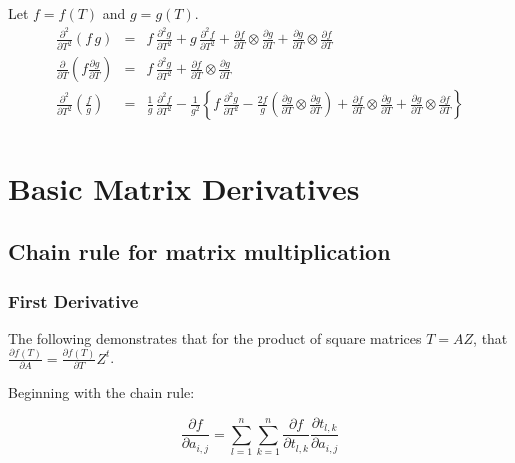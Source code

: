 \documentclass{report}
\begin{document}
\noindent Let $f=f(T)$ and $g=g(T)$.
\begin{eqnarray}
\frac{\partial^2}{\partial T^2} \left( f \, g \right) & = & f \, \frac{\partial^2 g}{\partial T^2} + g \, \frac{\partial^2 f}{\partial T^2} + \frac{\partial f}{\partial T} \otimes \frac{\partial g}{\partial T} +  \frac{\partial g}{\partial T} \otimes \frac{\partial f}{\partial T} \label{prod2} \\
\frac{\partial}{\partial T} \left( f \frac{\partial g}{\partial T} \right) & = & f \, \frac{\partial^2 g}{\partial T^2} + \frac{\partial f}{\partial T} \otimes \frac{\partial g}{\partial T} \label{diffusionopp} \\
\frac{\partial^2}{\partial T^2} \left( \frac{f}{g} \right) & = & \frac{1}{g} \, \frac{\partial^2 f}{\partial T^2} - \frac{1}{g^2} \left\{ f \, \frac{\partial^2 g}{\partial T^2} - \frac{2f}{g} \left( \frac{\partial g}{\partial T} \otimes \frac{\partial g}{\partial T} \right) + \frac{\partial f}{\partial T} \otimes \frac{\partial g}{\partial T} +  \frac{\partial g}{\partial T} \otimes \frac{\partial f}{\partial T} \right\} \nonumber \label{quotient2} \\
\end{eqnarray}

\chapter{Basic Matrix Derivatives}


\section{Chain rule for matrix multiplication}

\subsection{First Derivative}

The following demonstrates that for the product of square matrices $T = A Z$,
that $\frac{\partial f(T)}{\partial A} = \frac{\partial f(T)}{\partial T} Z^t$. \newline

\noindent Beginning with the chain rule:

\begin{equation} 
\label{eqn0}
\frac{\partial f}{\partial a_{i,j}} = 
\sum_{l=1}^{n} \sum_{k=1}^{n} 
\frac{\partial f}{\partial t_{l,k}} 
\frac{\partial t_{l,k}}{\partial a_{i,j}}
\end{equation}
\end{document}
